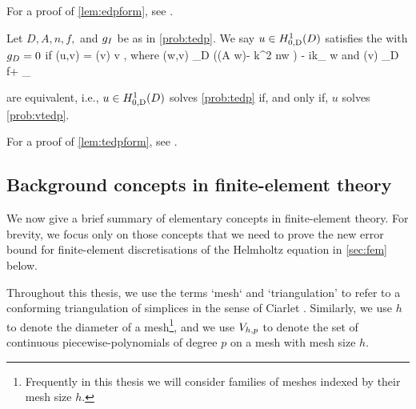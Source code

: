 For a proof of \cref{lem:edpform}, see \cite[Lemma 3.3]{GrPeSp:19}.

\bprob[Variational formulation of TEDP when $\gD = 0$]\label{prob:vtedp}
Let $D, A, n, f,$ and $g_{I}$ be as in \cref{prob:tedp}. We say $u \in \HozDD$ satisfies the  with $\gD = 0$ if
\beq\label{eq:vtedp}
\aT(u,v) = \FT(v) \tfa v \in \HozDD,
\eeq
where
\beq\label{eq:aT}
\aT(w,v) \de \int_{D} \big(\mleft(A \grad w\mright)\cdot\grad \vbar - k^2 n\minispace w \vbar\big) - ik\int_{\GI} \trGI w\minispace\trGI \vbar
\eeq
and
\beqs
\FT(v) \de \int_{D} f\minispace\vbar + \int_{\GI} \gI \minispace\trGI \vbar
\eeqs
\eprob

\label{lem:tedpform}
 are equivalent, i.e., $u \in \HozDD$ solves \cref{prob:tedp} if, and only if, $u$ solves \cref{prob:vtedp}.
\ele

For a proof of \cref{lem:tedpform}, see \cite[Lemma A.7]{GrPeSp:19}.
  
\subsection{Background concepts in finite-element theory}\label{sec:fetheory}

We now give a brief summary of elementary concepts in finite-element theory. For brevity, we focus only on those concepts that we need to prove the new error bound for finite-element discretisations of the Helmholtz equation in \cref{sec:fem} below.

Throughout this thesis, we use the terms `mesh` and `triangulation' to refer to a conforming triangulation of simplices in the sense of Ciarlet \cite[Paragraphs (FEM1) p. 61 and ($\cT_{h}$5) p. 71]{Ci:91}. Similarly, we use $h$ to denote the diameter of a mesh\footnote{Frequently in this thesis we will consider families of meshes indexed by their mesh size $h$.}, and we use $V_{h,p}$ to denote the set of continuous piecewise-polynomials of degree $p$ on a mesh with mesh size $h$.


